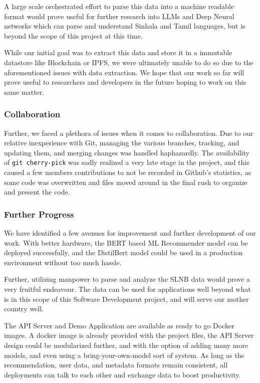 A large scale orchestrated effort to parse this data into a machine readable format would prove useful for further research into LLMs and Deep Neural networks which can parse and understand Sinhala and Tamil languages, but is beyond the scope of this project at this time.

While our initial goal was to extract this data and store it in a immutable datastore like Blockchain or IPFS, we were ultimately unable to do so due to the aforementioned issues with data extraction. We hope that our work so far will prove useful to researchers and developers in the future hoping to work on this same matter.

\subsubsection{Collaboration}
Further, we faced a plethora of issues when it comes to collaboration. Due to our relative inexperience with Git, managing the various branches, tracking, and updating them, and merging changes was handled haphazardly. The availability of \texttt{git cherry-pick} was sadly realized a very late stage in the project, and this caused a few members contributions to not be recorded in Github's statistics, as some code was overwritten and files moved around in the final rush to organize and present the code.

\subsubsection{Further Progress}
We have identified a few avenues for improvement and further development of our work. With better hardware, the BERT based ML Recommender model can be deployed successfully, and the DistilBert model could be used in a production environment without too much hassle.

Further, utilizing manpower to parse and analyze the SLNB data would prove a very fruitful endeavour. The data can be used for applications well beyond what is in this scope of this Software Development project, and will serve our mother country well.

The API Server and Demo Application are available as ready to go Docker images. A docker image is already provided with the project files, the API Server design could be modularized further, and with the option of adding many more models, and even using a bring-your-own-model sort of system. As long as the recommendation, user data, and metadata formats remain consistent, all deployments can talk to each other and exchange data to boost productivity.